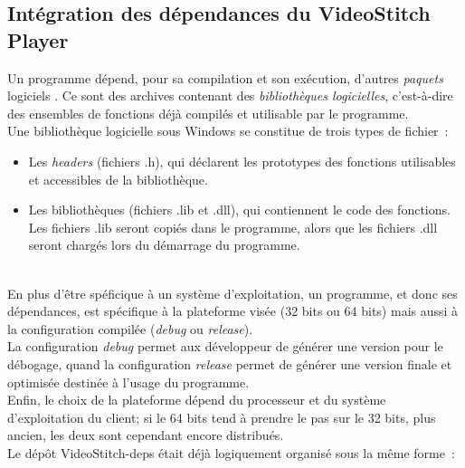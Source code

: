\subsection{Intégration des dépendances du VideoStitch Player}
\label{integration-dependances-player}
Un programme dépend, pour sa compilation et son exécution, d'autres \emph{paquets} logiciels
\cite{dependance-logicielle}. Ce sont des archives contenant des \emph{bibliothèques logicielles},
c'est-à-dire des ensembles de fonctions déjà compilés et utilisable par le programme.\\
Une bibliothèque logicielle sous Windows se constitue de trois types de fichier\cite{bibliotheque-logicielle}~:
\begin{itemize}
  \item Les \textit{headers} (fichiers .h), qui déclarent les prototypes des fonctions utilisables
  et accessibles de la bibliothèque.
  \item Les bibliothèques (fichiers .lib et .dll), qui contiennent le code des fonctions.
  Les fichiers .lib seront copiés dans le programme, alors que les fichiers .dll seront
  chargés lors du démarrage du programme\cite{bibliotheque-logicielle}.
\end{itemize}
\ \\
En plus d'être spéficique à un système d'exploitation, un programme, et donc
ses dépendances, est spécifique à la plateforme visée (32 bits ou 64 bits)\cite{64-bit-computing}
mais aussi à la configuration compilée (\textit{debug} ou \textit{release})\cite{msdn-debug-release}.\\
La configuration \textit{debug} permet aux développeur de générer une version pour le débogage,
quand la configuration \textit{release} permet de générer une version finale et optimisée destinée
à l'usage du programme. \\
Enfin, le choix de la plateforme dépend du processeur et du
système d'exploitation du client; si le 64 bits tend à prendre le pas sur le 32 bits,
plus ancien, les deux sont cependant encore distribués.\\
\newline
Le dépôt VideoStitch-deps était déjà logiquement organisé sous la même forme~:
